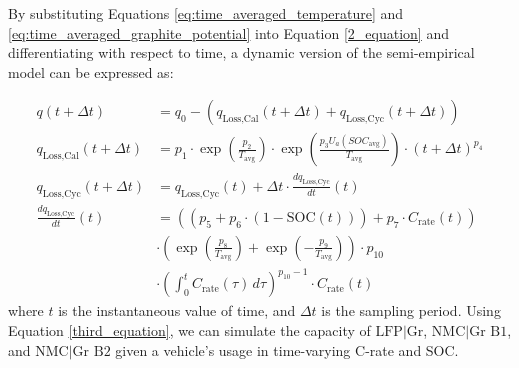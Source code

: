 \documentclass[pdflatex,sn-nature]{sn-jnl}%
\theoremstyle{thmstyleone}%
\theoremstyle{thmstyletwo}%
\theoremstyle{thmstylethree}%
\begin{document}
By substituting Equations \ref{eq:time_averaged_temperature} and \ref{eq:time_averaged_graphite_potential} into Equation \ref{2_equation} and differentiating with respect to time, a dynamic version of the semi-empirical model can be expressed as:


\begin{equation}
\label{third_equation}
\begin{aligned}
q(t+\Delta t) &= q_0 -  (q_{\text{Loss,Cal}}(t+\Delta t) + q_{\text{Loss,Cyc}}(t+\Delta t)) \\
q_{\text{Loss,Cal}}(t+\Delta t) &= p_1 \cdot \exp\left(\frac{p_2}{T_\mathrm{avg}}\right) \cdot \exp\left(\frac{p_3 U_a(SOC_\mathrm{avg})}{T_\mathrm{avg}}\right) \cdot (t+\Delta t)^{p_4 }\\
q_{\text{Loss,Cyc}}(t+\Delta t) &= q_\text{Loss,Cyc}(t) + \Delta t \cdot \frac{dq_{\text{Loss,Cyc}}}{dt}(t)
\\
\frac{dq_{\text{Loss,Cyc}}}{dt} (t)&= \left((p_5 + p_6 \cdot (1 - \text{SOC}(t))) + p_7 \cdot C_{\text{rate}}(t)\right) \\&\cdot \left(\exp\left(\frac{p_8}{T_\mathrm{avg}}\right) + \exp\left(-\frac{p_9}{T_\mathrm{avg}}\right)\right) \cdot p_{10} \\&\cdot \left(\int_0^t C_{\text{rate}}(\tau) \, d\tau\right)^{p_{10}-1} \cdot C_{\text{rate}}(t)
\end{aligned}
\end{equation}
where $t$ is the instantaneous value of time, and $\Delta t$ is the sampling period. Using Equation \ref{third_equation}, we can simulate the capacity of $\text{LFP}|\text{Gr}$, $\text{NMC}|\text{Gr~B1}$, and $\text{NMC}|\text{Gr~B2}$ given a vehicle's usage in time-varying C-rate and SOC.

\clearpage
\end{document}
